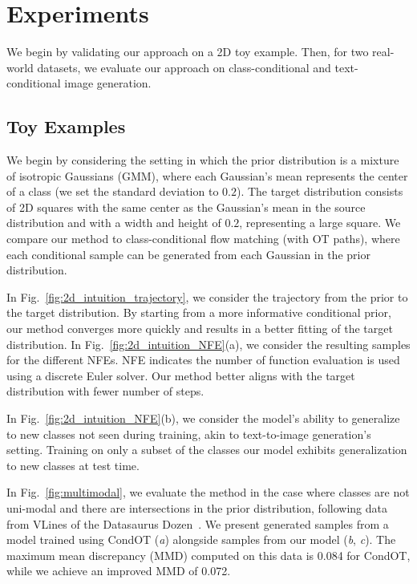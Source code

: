 




\section{Experiments}

We begin by validating our approach on a 2D toy example.
Then, for two real-world datasets, we evaluate our approach on class-conditional and text-conditional image generation.

\subsection{Toy Examples}
\label{sec:toy_example}

We begin by considering the setting in which the prior distribution is a mixture of isotropic Gaussians (GMM), where each Gaussian's mean represents the center of a class (we set the standard deviation to $0.2$). The target distribution consists of 2D squares with the same center as the Gaussian's mean in the source distribution and with a width and height of $0.2$, representing a large square.   
We compare our method to class-conditional flow matching (with OT paths), where each conditional sample can be generated from each Gaussian in the prior distribution. 

In Fig.~\ref{fig:2d_intuition_trajectory}, we consider the trajectory from the prior to the target distribution. By starting from a more informative conditional prior, our method converges more quickly and results in a better fitting of the target distribution. 
In Fig.~\ref{fig:2d_intuition_NFE}(a), we consider the resulting samples for the different NFEs.
NFE indicates the number of function evaluation is used using a discrete Euler solver.
Our method better aligns with the target distribution with fewer number of steps. 

In Fig.~\ref{fig:2d_intuition_NFE}(b), we consider the model's ability to generalize to new classes not seen during training, akin to text-to-image generation's setting. Training on only a subset of the classes our model exhibits generalization to new classes at test time. 

In Fig.~\ref{fig:multimodal}, we evaluate the method in the case where classes are not uni-modal and there are intersections in the prior distribution, following data from VLines of the Datasaurus Dozen~\cite{gillespie2025datasauRus}. We present generated samples from a model trained using CondOT (\emph{a}) alongside samples from our model (\emph{b}, \emph{c}). The maximum mean discrepancy (MMD) computed on this data is 0.084 for CondOT, while we achieve an improved MMD of 0.072.






